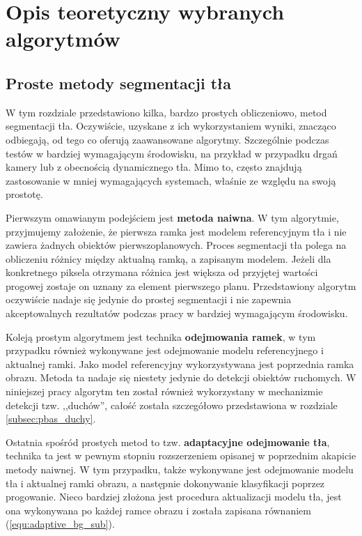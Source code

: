 \chapter{Opis teoretyczny wybranych algorytmów}
\label{cha:opis_teoretyczny_wybranych_algorytmow}

\section{Proste metody segmentacji tła}
\label{sec:proste_metody}

W tym rozdziale przedstawiono kilka, bardzo prostych obliczeniowo, metod segmentacji tła. Oczywiście, uzyskane z ich wykorzystaniem wyniki, znacząco odbiegają, od tego co oferują zaawansowane algorytmy. Szczególnie podczas testów w bardziej wymagającym środowisku, na przykład w przypadku drgań kamery lub z obecnością dynamicznego tła. Mimo to, często znajdują zastosowanie w mniej wymagających systemach, właśnie ze względu na swoją prostotę.

Pierwszym omawianym podejściem jest \textbf{metoda naiwna}. W tym algorytmie, przyjmujemy założenie, że pierwsza ramka jest modelem referencyjnym tła i nie zawiera żadnych obiektów pierwszoplanowych. Proces segmentacji tła polega na obliczeniu różnicy między aktualną ramką, a zapisanym modelem. Jeżeli dla konkretnego piksela otrzymana różnica jest większa od przyjętej wartości progowej zostaje on uznany za element pierwszego planu. Przedstawiony algorytm oczywiście nadaje się jedynie do prostej segmentacji i nie zapewnia akceptowalnych rezultatów podczas pracy w bardziej wymagającym środowisku.

Koleją prostym algorytmem jest technika \textbf{odejmowania ramek}, w tym przypadku również wykonywane jest odejmowanie modelu referencyjnego i aktualnej ramki. Jako model referencyjny wykorzystywana jest poprzednia ramka obrazu. Metoda ta nadaje się niestety jedynie do detekcji obiektów ruchomych. W niniejszej pracy algorytm ten został również wykorzystany w mechanizmie detekcji tzw. ,,duchów'', całość została szczegółowo przedstawiona w rozdziale \ref{subsec:pbas_duchy}.

Ostatnia spośród prostych metod to tzw. \textbf{adaptacyjne odejmowanie tła}, technika ta jest w pewnym stopniu rozszerzeniem opisanej w poprzednim akapicie metody naiwnej. W tym przypadku, także wykonywane jest odejmowanie modelu tła i aktualnej ramki obrazu, a następnie dokonywanie klasyfikacji poprzez progowanie. Nieco bardziej złożona jest procedura aktualizacji modelu tła, jest ona wykonywana po każdej ramce obrazu i została zapisana równaniem (\ref{equ:adaptive_bg_sub}).

